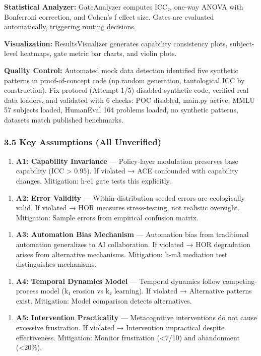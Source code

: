 \textbf{Statistical Analyzer:} GateAnalyzer computes ICC₂, one-way ANOVA with Bonferroni correction, and Cohen's f effect size. Gates are evaluated automatically, triggering routing decisions.

\textbf{Visualization:} ResultsVisualizer generates capability consistency plots, subject-level heatmaps, gate metric bar charts, and violin plots.

\textbf{Quality Control:} Automated mock data detection identified five synthetic patterns in proof-of-concept code (np.random generation, tautological ICC by construction). Fix protocol (Attempt 1/5) disabled synthetic code, verified real data loaders, and validated with 6 checks: POC disabled, main.py active, MMLU 57 subjects loaded, HumanEval 164 problems loaded, no synthetic patterns, datasets match published benchmarks.

\subsubsection{3.5 Key Assumptions (All Unverified)}

\begin{enumerate}
\item \textbf{A1: Capability Invariance} — Policy-layer modulation preserves base capability (ICC > 0.95). If violated → ACE confounded with capability changes. Mitigation: h-e1 gate tests this explicitly.
\end{enumerate}

\begin{enumerate}
\item \textbf{A2: Error Validity} — Within-distribution seeded errors are ecologically valid. If violated → HOR measures stress-testing, not realistic oversight. Mitigation: Sample errors from empirical confusion matrix.
\end{enumerate}

\begin{enumerate}
\item \textbf{A3: Automation Bias Mechanism} — Automation bias from traditional automation generalizes to AI collaboration. If violated → HOR degradation arises from alternative mechanisms. Mitigation: h-m3 mediation test distinguishes mechanisms.
\end{enumerate}

\begin{enumerate}
\item \textbf{A4: Temporal Dynamics Model} — Temporal dynamics follow competing-process model (k₁ erosion vs k₂ learning). If violated → Alternative patterns exist. Mitigation: Model comparison detects alternatives.
\end{enumerate}

\begin{enumerate}
\item \textbf{A5: Intervention Practicality} — Metacognitive interventions do not cause excessive frustration. If violated → Intervention impractical despite effectiveness. Mitigation: Monitor frustration (<7/10) and abandonment (<20\%).
\end{enumerate}

